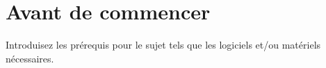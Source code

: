 \section{Avant de commencer}
Introduisez les prérequis pour le sujet tels que les logiciels et/ou matériels nécessaires.
